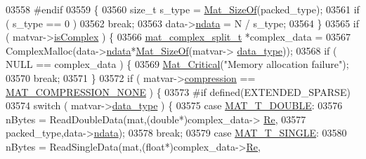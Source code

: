 \begin{DoxyCode}
{{{{{{{{{{{{{{{{{{03558 \textcolor{preprocessor}{#endif}
03559             \{
03560                 \textcolor{keywordtype}{size\_t} s\_type = \hyperlink{group__mat__util_gab6774aabdc124c540c1e7686d0804940}{Mat\_SizeOf}(packed\_type);
03561                 \textcolor{keywordflow}{if} ( s\_type == 0 )
03562                     \textcolor{keywordflow}{break};
03563                 data->\hyperlink{group___m_a_t_a1beb8a8c58a808207cbea650563a9b63}{ndata} = N / s\_type;
03564             \}
03565             \textcolor{keywordflow}{if} ( matvar->\hyperlink{group___m_a_t_aeb03b3a69f108dc05470b00443a43739}{isComplex} ) \{
03566                 \hyperlink{group___m_a_t_structmat__complex__split__t}{mat\_complex\_split\_t} *complex\_data =
03567                     ComplexMalloc(data->\hyperlink{group___m_a_t_a1beb8a8c58a808207cbea650563a9b63}{ndata}*\hyperlink{group__mat__util_gab6774aabdc124c540c1e7686d0804940}{Mat\_SizeOf}(matvar->
      \hyperlink{group___m_a_t_ab6aafe9bd77f0f077852593dec438144}{data\_type}));
03568                 \textcolor{keywordflow}{if} ( NULL == complex\_data ) \{
03569                     \hyperlink{group__mat__util_gaf51f2bfbb5580f575e4dd79757e2b80c}{Mat\_Critical}(\textcolor{stringliteral}{"Memory allocation failure"});
03570                     \textcolor{keywordflow}{break};
03571                 \}
03572                 \textcolor{keywordflow}{if} ( matvar->\hyperlink{group___m_a_t_aeef0466048621cb2c959ba7f6c774d06}{compression} == \hyperlink{group___m_a_t_gga768c318af97bd2567758ecb001ceb7f4a2280b97631ff5dd24dec55261dc587b6}{MAT\_COMPRESSION\_NONE} ) \{
03573 \textcolor{preprocessor}{#if defined(EXTENDED\_SPARSE)}
03574                     \textcolor{keywordflow}{switch} ( matvar->\hyperlink{group___m_a_t_ab6aafe9bd77f0f077852593dec438144}{data\_type} ) \{
03575                         \textcolor{keywordflow}{case} \hyperlink{group___m_a_t_ggacf7b3b879282b7ab3a51190e49bf3453a31e721ecf7e188196f83c32838288797}{MAT\_T\_DOUBLE}:
03576                             nBytes = ReadDoubleData(mat,(\textcolor{keywordtype}{double}*)complex\_data->
      \hyperlink{group___m_a_t_a484a93607508adac2bce53a0252e0325}{Re},
03577                                 packed\_type,data->\hyperlink{group___m_a_t_a1beb8a8c58a808207cbea650563a9b63}{ndata});
03578                             \textcolor{keywordflow}{break};
03579                         \textcolor{keywordflow}{case} \hyperlink{group___m_a_t_ggacf7b3b879282b7ab3a51190e49bf3453a3a3657d40e9212c923d9b9d03531b64c}{MAT\_T\_SINGLE}:
03580                             nBytes = ReadSingleData(mat,(\textcolor{keywordtype}{float}*)complex\_data->\hyperlink{group___m_a_t_a484a93607508adac2bce53a0252e0325}{Re},
}}}}}}}}}}}}}}}}}}
\end{DoxyCode}
